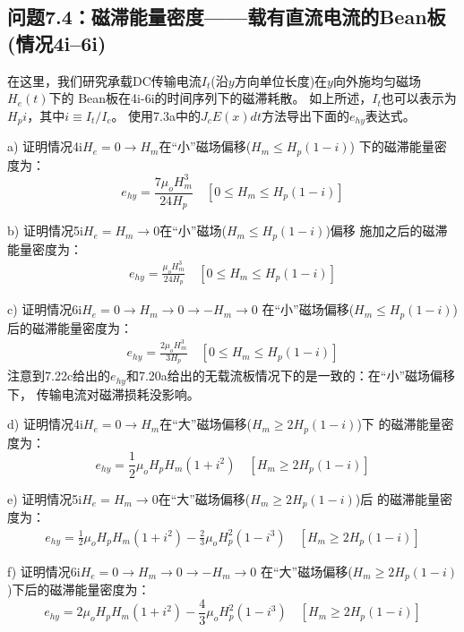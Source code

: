\subsection{问题7.4：磁滞能量密度——载有直流电流的Bean板(情况4i--6i)}
在这里，我们研究承载DC传输电流$I_t$(沿$y$方向单位长度)在$y$向外施均匀磁场$H_e(t)$下的
Bean板在4i-6i的时间序列下的磁滞耗散。
如上所述，$I_t$也可以表示为$H_pi$，其中$i\equiv I_t/ I_c$。
使用7.3a中的$J_c E(x)dt$方法导出下面的$e_{hy}$表达式。

a) 证明情况4i$H_e=0\rightarrow H_m$在“小”磁场偏移($H_m\le H_p(1-i)$)
下的磁滞能量密度为：
\begin{equation}%
e_{hy}=\frac{7\mu_oH_{m}^{3}}{24H_p} \quad  [0\leq H_m\leq H_p(1-i)]
\end{equation}

b) 证明情况5i$H_e=H_m\rightarrow 0$在“小”磁场($H_m\le H_p(1-i)$)偏移
施加之后的磁滞能量密度为：
\begin{align*}%
e_{hy}=\frac{\mu_oH_{m}^{3}}{24H_p} \quad   [0\leq H_m\leq H_p(1-i)] \tag{7.22b}
\end{align*}

c) 证明情况6i$H_e=0\rightarrow H_m\rightarrow 0\rightarrow -H_m\rightarrow 0$
在“小”磁场偏移($H_m\le H_p(1-i)$)后的磁滞能量密度为：
\begin{align*}%
e_{hy}=\frac{2\mu_oH_{m}^{3}}{3H_p} \quad  [0\leq H_m\leq H_p(1-i)] \tag{7.22c}
\end{align*}
注意到7.22c给出的$e_{hy}$和7.20a给出的无载流板情况下的是一致的：在“小”磁场偏移下，
传输电流对磁滞损耗没影响。

d) 证明情况4i$H_e=0\rightarrow H_m$在“大”磁场偏移($H_m\ge 2H_p(1-i)$)下
的磁滞能量密度为：
\begin{equation}%
e_{hy}=\frac{1}{2}\mu_oH_pH_m(1+i^2) \quad [H_m\geq2H_p(1-i)]
\end{equation}

e) 证明情况5i$H_e=H_m\rightarrow 0$在“大”磁场偏移($H_m\ge 2H_p(1-i)$)后
的磁滞能量密度为：
\begin{align*}%
e_{hy}=\frac{1}{2}\mu_oH_pH_m(1+i^2)-\frac{2}{3}\mu_oH_{p}^{2}(1-i^3) \quad [H_m\geq2H_p(1-i)]\tag{7.23b}
\end{align*}

f) 证明情况6i$H_e=0\rightarrow H_m\rightarrow 0\rightarrow -H_m\rightarrow 0$
在“大”磁场偏移($H_m\ge 2H_p(1-i)$)下后的磁滞能量密度为：
\begin{equation}%
e_{hy}=2\mu_oH_pH_m(1+i^2)-\frac{4}{3}\mu_oH_{p}^{2}(1-i^3)\quad  [H_m\geq2H_p(1-i)] \tag{7.23c}
\end{equation}


